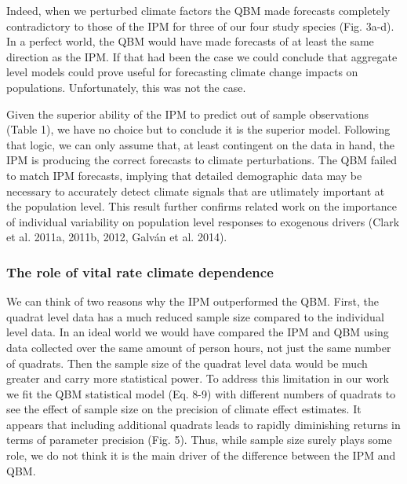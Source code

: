 \documentclass[12pt,]{article}
\begin{document}
Indeed, when we perturbed climate factors the QBM made forecasts
completely contradictory to those of the IPM for three of our four study
species (Fig. 3a-d). In a perfect world, the QBM would have made
forecasts of at least the same direction as the IPM. If that had been
the case we could conclude that aggregate level models could prove
useful for forecasting climate change impacts on populations.
Unfortunately, this was not the case.

Given the superior ability of the IPM to predict out of sample
observations (Table 1), we have no choice but to conclude it is the
superior model. Following that logic, we can only assume that, at least
contingent on the data in hand, the IPM is producing the correct
forecasts to climate perturbations. The QBM failed to match IPM
forecasts, implying that detailed demographic data may be necessary to
accurately detect climate signals that are utlimately important at the
population level. This result further confirms related work on the
importance of individual variability on population level responses to
exogenous drivers (Clark et al. 2011a, 2011b, 2012, Galván et al. 2014).

\subsubsection{The role of vital rate climate
dependence}\label{the-role-of-vital-rate-climate-dependence}

We can think of two reasons why the IPM outperformed the QBM. First, the
quadrat level data has a much reduced sample size compared to the
individual level data. In an ideal world we would have compared the IPM
and QBM using data collected over the same amount of person hours, not
just the same number of quadrats. Then the sample size of the quadrat
level data would be much greater and carry more statistical power. To
address this limitation in our work we fit the QBM statistical model
(Eq. 8-9) with different numbers of quadrats to see the effect of sample
size on the precision of climate effect estimates. It appears that
including additional quadrats leads to rapidly diminishing returns in
terms of parameter precision (Fig. 5). Thus, while sample size surely
plays some role, we do not think it is the main driver of the difference
between the IPM and QBM.
\end{document}
